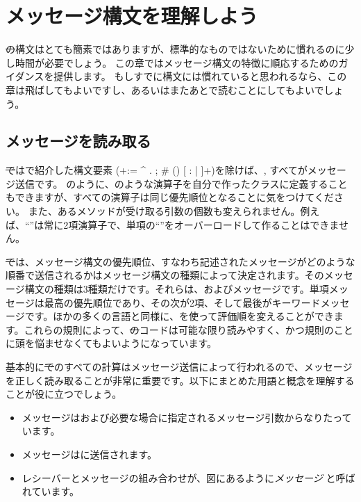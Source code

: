 \documentclass[a4paper,10pt,twoside]{book}
\begin{document}
	\renewcommand{\nnbb}[2]{} %
	\sloppy
\fi
\chapter{メッセージ構文を理解しよう}

\st の構文はとても簡素ではありますが、標準的なものではないために慣れるのに少し時間が必要でしょう。
この章ではメッセージ構文の特徴に順応するためのガイダンスを提供します。
もしすでに構文には慣れていると思われるなら、この章は飛ばしてもよいですし、あるいはまたあとで読むことにしてもよいでしょう。

\section{メッセージを読み取る}

\st ではで紹介した構文要素 (\ct+:= ^ . ; # () {} [ : | ]+)を除けば、, すべてがメッセージ送信です。
のように、\ct{+}のような演算子を自分で作ったクラスに定義することもできますが、すべての演算子は同じ優先順位となることに気をつけてください。
また、あるメソッドが受け取る引数の個数も変えられません。例えば、``\ct{-}''は常に2項演算子で、単項の``\ct{-}''をオーバーロードして作ることはできません。

\st では、メッセージ構文の優先順位、すなわち記述されたメッセージがどのような順番で送信されるかはメッセージ構文の種類によって決定されます。そのメッセージ構文の種類は3種類だけです。それらは、およびメッセージです。単項メッセージは最高の優先順位であり、その次が2項、そして最後がキーワードメッセージです。ほかの多くの言語と同様に、を使って評価順を変えることができます。これらの規則によって、\st のコードは可能な限り読みやすく、かつ規則のことに頭を悩ませなくてもよいようになっています。

基本的に\st でのすべての計算はメッセージ送信によって行われるので、メッセージを正しく読み取ることが非常に重要です。以下にまとめた用語と概念を理解することが役に立つでしょう。

\begin{itemize}
  \item メッセージはおよび必要な場合に指定されるメッセージ引数からなりたっています。
  \item メッセージはに送信されます。
  \item レシーバーとメッセージの組み合わせが、図にあるように\emph{メッセージ} と呼ばれています。
\end{itemize}
\end{document}
